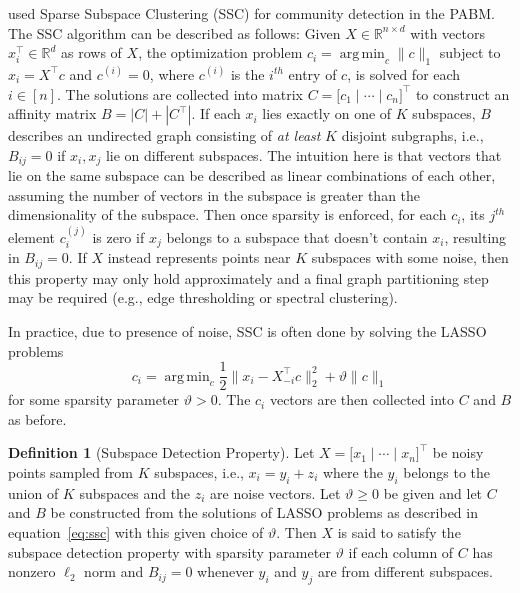 \documentclass[
  11pt,
]{article}
\theoremstyle{definition}
\newtheorem{definition}{Definition}[section]
\theoremstyle{definition}
\theoremstyle{definition}
\theoremstyle{definition}
\theoremstyle{remark}
\begin{document}
\cite{noroozi2019estimation} used Sparse Subspace Clustering (SSC)
\citep{5206547} for community detection in the PABM.
The SSC algorithm can be described as follows:
Given \(X \in \mathbb{R}^{n \times d}\) with vectors
\(x_i^\top \in \mathbb{R}^d\) as rows of \(X\), the optimization problem
\(c_i = \mathop{\mathrm{arg\,min}}_{c} \|c\|_1\) subject to \(x_i = X^\top c\) and
\(c^{(i)} = 0\), where \(c^{(i)}\) is the \(i^{th}\) entry of \(c\), is solved for each \(i \in [n]\).
The solutions are collected into matrix
\(C = \bigl[ c_1 \mid \cdots \mid c_n \bigr]^\top\) to
construct an affinity matrix \(B = |C| + |C^\top|\). If each \(x_i\) lies
exactly on one of \(K\) subspaces, \(B\) describes an undirected graph
consisting of \emph{at least} \(K\) disjoint subgraphs, i.e., \(B_{ij} = 0\) if \(x_i, x_j\) lie on different subspaces.
The intuition here is that vectors that lie on the same subspace can be described as linear combinations of each other, assuming the number of vectors in the subspace is greater than the dimensionality of the subspace.
Then once sparsity is enforced, for each \(c_i\), its \(j^{th}\) element \(c_i^{(j)}\) is zero if \(x_j\) belongs to a subspace that doesn't contain \(x_i\), resulting in \(B_{ij} = 0\).
If \(X\) instead represents points near \(K\) subspaces with some noise,
then this property may only hold approximately and a final graph partitioning step may be required
(e.g., edge thresholding or spectral clustering).

In practice, due to presence of noise, SSC is often done by solving the LASSO problems
\begin{equation} 
\label{eq:ssc}
c_i = \mathop{\mathrm{arg\,min}}_c \frac{1}{2} \|x_i - X_{-i}^\top c\|^2_2 + \vartheta \|c\|_1
\end{equation}
for some sparsity parameter \(\vartheta > 0\).
The \(c_i\) vectors are then collected into \(C\) and \(B\) as before.

\begin{definition}[Subspace Detection Property]
\label{def:subspace_detection}
Let $X = \bigl[ x_1 \mid \cdots \mid x_n \bigr]^\top$ be noisy points sampled from $K$ subspaces, i.e., $x_i = y_i + z_i$ where the $y_i$ belongs to the union of $K$ subspaces and the $z_i$ are noise vectors. 
Let $\vartheta \geq 0$ be given and let $C$ and $B$ be constructed from the solutions of LASSO problems as described in equation~\eqref{eq:ssc} with this given choice of $\vartheta$. 
Then $X$ is said to satisfy the subspace detection property with sparsity parameter $\vartheta$ if each column of $C$ has nonzero $\ell_2$ norm and $B_{ij} = 0$ whenever $y_i$ and $y_j$ are from different subspaces.
\end{definition}
\end{document}
